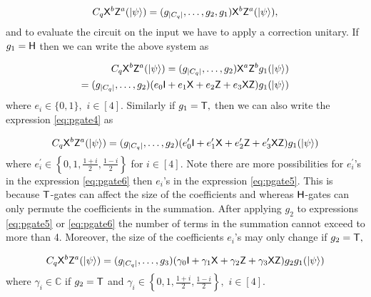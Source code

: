 \begin{equation}
\label{eq:pgate4}
C_q {\sf X}^b{\sf Z}^a ({\lvert}\psi\rangle)=(g_{|C_q|},\ldots,g_2,g_1 ){\sf X}^b{\sf Z}^a ({\lvert}\psi\rangle),
\end{equation}
and to evaluate the circuit on the input we have to apply a correction unitary. If $g_1={\sf H}$ then we can write the above system as 

\begin{equation}
\begin{aligned}
\label{eq:pgate5}
C_q {\sf X}^b{\sf Z}^a ({\lvert}\psi\rangle)=(g_{|C_q|},\ldots,g_2)  {\sf X}^a {\sf Z}^b g_1 ({\lvert}\psi\rangle) \\
=(g_{|C_q|},\ldots,g_2)(e_0 {\sf I} +  e_1 {\sf X} + e_2 {\sf Z} + e_3{\sf X} {\sf Z})g_1 ({\lvert}\psi\rangle)
\end{aligned}
\end{equation}
where  $e_i \in \{0,1\},$  $i\in[4].$ Similarly if $g_1={\sf T},$ then we can also write the expression \ref{eq:pgate4} as 

\begin{equation}
\begin{aligned}
\label{eq:pgate6}
C_q {\sf X}^b{\sf Z}^a ({\lvert}\psi\rangle)=(g_{|C_q|},\ldots,g_2)(e_0^\prime {\sf I} +  e_1^\prime {\sf X} + e_2^\prime {\sf Z} + e_3^\prime {\sf X} {\sf Z})g_1 ({\lvert}\psi\rangle)
\end{aligned}
\end{equation}
where $e_i^\prime \in\left\{0,1, \frac{1+i}{2}, \frac{1-i}{2}\right\}$  for $i\in[4].$ Note there are more possibilities for $e_i^\prime$'s in the expression \ref{eq:pgate6} then $e_i$'s in the expression \ref{eq:pgate5}. This is because ${\sf T}$-gates can affect the size of the coefficients and whereas ${\sf H}$-gates can only permute the coefficients in the summation. After applying $g_2$ to expressions \ref{eq:pgate5} or \ref{eq:pgate6} the number of terms in the summation cannot exceed to more than 4. Moreover, the size of the coefficients $e_i$'s may only change if $g_2={\sf T},$ 

\begin{equation}
\begin{aligned}
\label{eq:pgate7}
C_q {\sf X}^b{\sf Z}^a ({\lvert}\psi\rangle)=(g_{|C_q|},\ldots,g_3)(\gamma_0 {\sf I} +  \gamma_1 {\sf X} + \gamma_2 {\sf Z} + \gamma_3 {\sf X} {\sf Z})g_2g_1 ({\lvert}\psi\rangle)
\end{aligned}
\end{equation}
where $\gamma_i \in \mathbb{C}$ if $g_2={\sf T}$ and $\gamma_i  \in\left\{0,1, \frac{1+i}{2}, \frac{1-i}{2}\right\},$  $i\in[4].$

